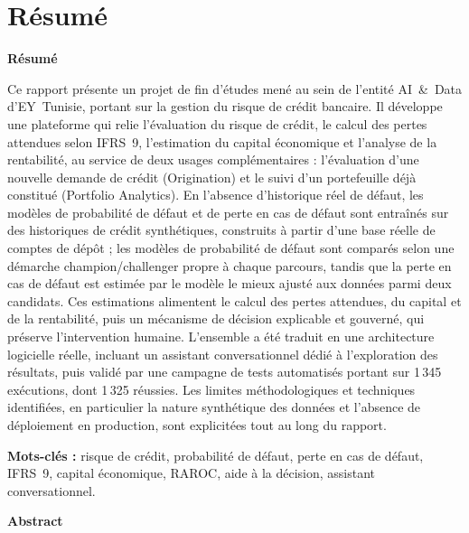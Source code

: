 \chapter*{Résumé}

\noindent\textbf{Résumé}

\noindent Ce rapport présente un projet de fin d'études mené au sein de l'entité AI~\&~Data d'EY~Tunisie, portant sur la gestion du risque de crédit bancaire. Il développe une plateforme qui relie l'évaluation du risque de crédit, le calcul des pertes attendues selon IFRS~9, l'estimation du capital économique et l'analyse de la rentabilité, au service de deux usages complémentaires : l'évaluation d'une nouvelle demande de crédit (Origination) et le suivi d'un portefeuille déjà constitué (Portfolio Analytics). En l'absence d'historique réel de défaut, les modèles de probabilité de défaut et de perte en cas de défaut sont entraînés sur des historiques de crédit synthétiques, construits à partir d'une base réelle de comptes de dépôt ; les modèles de probabilité de défaut sont comparés selon une démarche champion/challenger propre à chaque parcours, tandis que la perte en cas de défaut est estimée par le modèle le mieux ajusté aux données parmi deux candidats. Ces estimations alimentent le calcul des pertes attendues, du capital et de la rentabilité, puis un mécanisme de décision explicable et gouverné, qui préserve l'intervention humaine. L'ensemble a été traduit en une architecture logicielle réelle, incluant un assistant conversationnel dédié à l'exploration des résultats, puis validé par une campagne de tests automatisés portant sur 1\,345 exécutions, dont 1\,325 réussies. Les limites méthodologiques et techniques identifiées, en particulier la nature synthétique des données et l'absence de déploiement en production, sont explicitées tout au long du rapport.

\medskip
\noindent\textbf{Mots-clés :} risque de crédit, probabilité de défaut, perte en cas de défaut, IFRS~9, capital économique, RAROC, aide à la décision, assistant conversationnel.

\bigskip
\noindent\textbf{Abstract}

